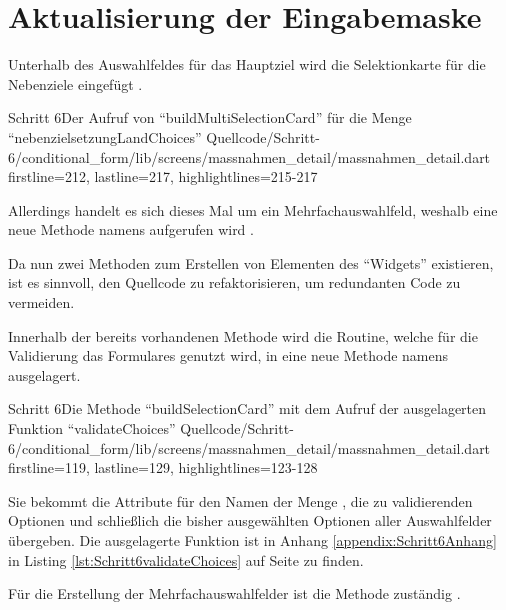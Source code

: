 \section{Aktualisierung der Eingabemaske}

Unterhalb des Auswahlfeldes für das Hauptziel wird die Selektionkarte für die Nebenziele eingefügt \Lst{\ref{lst:Schritt6buildMultiSelectionCardnebenzielsetzungLandChoices}}.
\begin{alexlisting}{Schritt 6}{Der Aufruf von \enquote{buildMultiSelectionCard} für die Menge \enquote{nebenzielsetzungLandChoices}}
  {Quellcode/Schritt-6/conditional_form/lib/screens/massnahmen_detail/massnahmen_detail.dart}
  {firstline=212, lastline=217, highlightlines={215-217}}
  \label{lst:Schritt6buildMultiSelectionCardnebenzielsetzungLandChoices}
\end{alexlisting}

Allerdings handelt es sich dieses Mal um ein Mehrfachauswahlfeld,
weshalb eine neue Methode namens  aufgerufen wird .

Da nun zwei Methoden zum Erstellen von Elementen des \enquote{Widgets}  existieren,
ist es sinnvoll,
den Quellcode zu refaktorisieren,
um redundanten Code zu vermeiden.



Innerhalb der bereits vorhandenen Methode  wird die Routine,
welche für die Validierung das Formulares genutzt wird,
in eine neue Methode namens   ausgelagert.
\begin{alexlisting}{Schritt 6}{Die Methode \enquote{buildSelectionCard} mit dem Aufruf der ausgelagerten Funktion \enquote{validateChoices}}
  {Quellcode/Schritt-6/conditional_form/lib/screens/massnahmen_detail/massnahmen_detail.dart}
  {firstline=119, lastline=129, highlightlines={123-128}}
  \label{lst:Schritt6buildSelectionCard}
\end{alexlisting}

Sie bekommt die Attribute für den Namen der Menge ,
die zu validierenden Optionen 
und schließlich die bisher ausgewählten Optionen aller Auswahlfelder  übergeben.
Die ausgelagerte Funktion ist in Anhang \ref{appendix:Schritt6Anhang} in Listing \ref{lst:Schritt6validateChoices} auf Seite \pageref{lst:Schritt6validateChoices} zu finden.


Für die Erstellung der Mehrfachauswahlfelder ist die Methode  zuständig \Lst{\ref{lst:Schritt6buildMultiSelectionCard}}.

